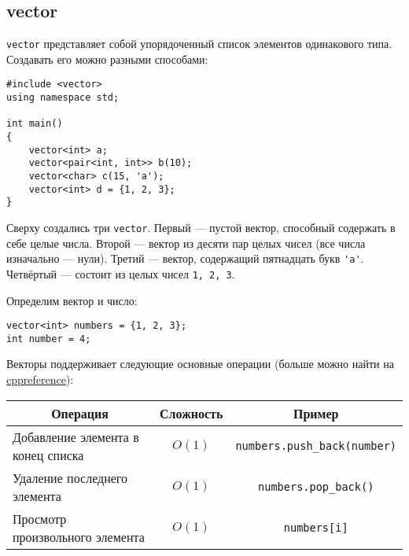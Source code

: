 \subsection{vector}

\lstinline|vector| представляет собой упорядоченный список элементов одинакового типа.
Создавать его можно разными способами:

\begin{lstlisting}
#include <vector>
using namespace std;

int main()
{
    vector<int> a;
    vector<pair<int, int>> b(10);
    vector<char> c(15, 'a');
    vector<int> d = {1, 2, 3};
}
\end{lstlisting}
Сверху создались три \lstinline|vector|. Первый --- пустой вектор, способный содержать в себе целые числа. Второй --- вектор из десяти пар целых чисел (все числа изначально --- нули). Третий --- вектор, содержащий пятнадцать букв \lstinline|'a'|. Четвёртый --- состоит из целых чисел \lstinline|1, 2, 3|.


Определим вектор и число:
\begin{lstlisting}
vector<int> numbers = {1, 2, 3};
int number = 4;
\end{lstlisting}
Векторы поддерживает следующие основные операции (больше можно найти на \href{https://ru.cppreference.com/w/cpp/container/vector}{cppreference}):

\begin{table}[h]
    \begin{tabular}{|l|c|c|}
    \hline
    \multicolumn{1}{|c|}{Операция} & Сложность & Пример \\ \hline
    Добавление элемента в конец списка &  $O(1)$ & \lstinline|numbers.push_back(number)| \\ \hline
    Удаление последнего элемента & $O(1)$ & \lstinline|numbers.pop_back()| \\ \hline
    Просмотр произвольного элемента & $O(1)$ & \lstinline|numbers[i]| \\ 
    \hline
    \end{tabular}
\end{table}

